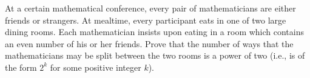 At a certain mathematical conference, every pair of mathematicians are either friends or strangers. At mealtime, every participant eats in one of two large dining rooms. Each mathematician insists upon eating in a room which contains an even number of his or her friends. Prove that the number of ways that the mathematicians may be split between the two rooms is a power of two (i.e., is of the form $ 2^k$ for some positive integer $ k$).